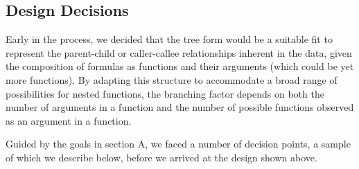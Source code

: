 \documentclass[conference]{IEEEtran}
\begin{document}
	\subsection{Design Decisions} Early in the process, we decided that the tree
	form would be a suitable fit to represent the parent-child or caller-callee
	relationships inherent in the data, given the composition of formulas as
	functions and their arguments (which could be yet more functions). By adapting
	this structure to accommodate a broad range of possibilities for nested
	functions, the branching factor depends on both the number of arguments in a
	function and the number of possible functions observed as an argument in a
	function. \par
	
	Guided by the goals in section A, we faced a number of decision points, a
	sample of which we describe below, before we arrived at the design shown above.
\end{document}
